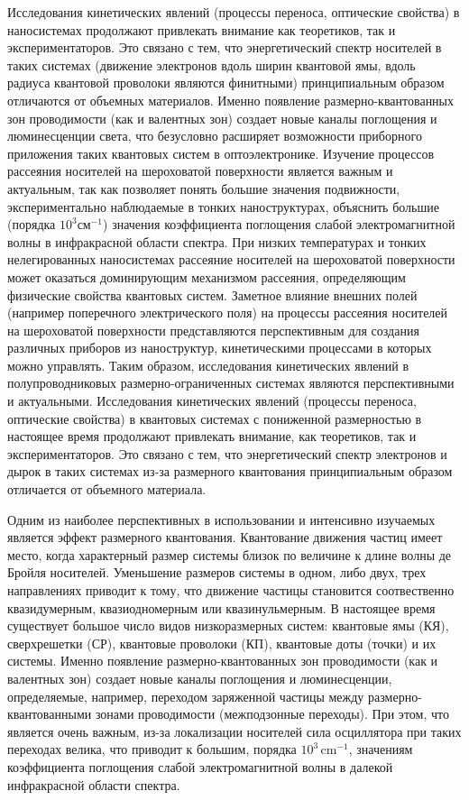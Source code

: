 {\actuality}
\ifsynopsis
Исследования кинетических явлений (процессы переноса, оптические свойства) в наносистемах продолжают привлекать внимание как теоретиков, так и экспериментаторов. Это связано с тем, что энергетический спектр носителей в таких системах (движение электронов вдоль ширин квантовой ямы, вдоль радиуса квантовой проволоки являются финитными) принципиальным образом отличаются от объемных материалов.
Именно появление размерно-квантованных зон проводимости (как и валентных зон) создает новые каналы поглощения и люминесценции света, что безусловно расширяет возможности приборного приложения таких квантовых систем в оптоэлектронике. Изучение процессов рассеяния носителей на шероховатой поверхности является важным и актуальным, так как позволяет понять большие значения подвижности, экспериментально наблюдаемые в тонких наноструктурах, объяснить большие (порядка $10^3$см$^{-1}$) значения коэффициента поглощения слабой электромагнитной волны в инфракрасной области спектра. При низких температурах и тонких нелегированных наносистемах рассеяние носителей на шероховатой поверхности может оказаться доминирующим механизмом рассеяния, определяющим физические свойства квантовых систем. Заметное влияние внешних полей (например поперечного электрического поля) на процессы рассеяния носителей на шероховатой поверхности представляются перспективным для создания различных приборов из наноструктур, кинетическими процессами в которых можно управлять.
Таким образом, исследования кинетических явлений в полупроводниковых размерно-ограниченных системах являются перспективными и актуальными.
\else
Исследования кинетических явлений (процессы переноса, оптические свойства) в квантовых системах с пониженной размерностью в настоящее время продолжают привлекать внимание, как теоретиков, так и экспериментаторов. Это связано с тем, что энергетический спектр электронов и дырок в таких системах из-за размерного квантования принципиальным образом отличается от объемного материала.

Одним из наиболее перспективных в использовании и интенсивно изучаемых является эффект размерного квантования. Квантование движения частиц имеет место, когда характерный размер системы близок по величине к длине волны де Бройля носителей. Уменьшение размеров системы в одном, либо двух, трех направлениях приводит к тому, что движение частицы становится соотвественно квазидумерным, квазиодномерным или квазинульмерным. В настоящее время существует большое число видов низкоразмерных систем: квантовые ямы (КЯ), сверхрешетки (СР), квантовые проволоки (КП), квантовые доты (точки) и их системы. Именно появление размерно-квантованных зон проводимости (как и валентных зон) создает новые каналы поглощения и люминесценции, определяемые, например, переходом заряженной частицы между размерно-квантованными зонами проводимости (межподзонные переходы). При этом, что является очень важным, из-за локализации носителей сила осциллятора при таких переходах велика, что приводит к большим, порядка $10^3\,\text{cm}^{-1}$, значениям коэффициента поглощения слабой электромагнитной волны в далекой инфракрасной области спектра.

